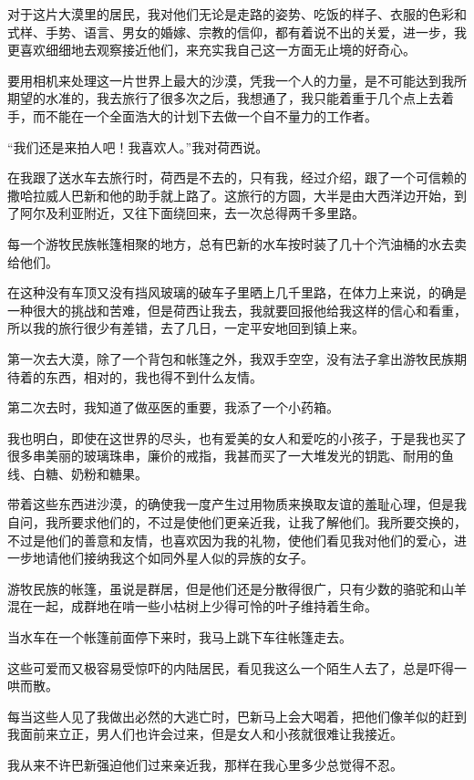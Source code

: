 \par 对于这片大漠里的居民，我对他们无论是走路的姿势、吃饭的样子、衣服的色彩和式样、手势、语言、男女的婚嫁、宗教的信仰，都有着说不出的关爱，进一步，我更喜欢细细地去观察接近他们，来充实我自己这一方面无止境的好奇心。
\par 要用相机来处理这一片世界上最大的沙漠，凭我一个人的力量，是不可能达到我所期望的水准的，我去旅行了很多次之后，我想通了，我只能着重于几个点上去着手，而不能在一个全面浩大的计划下去做一个自不量力的工作者。
\par “我们还是来拍人吧！我喜欢人。”我对荷西说。
\par 在我跟了送水车去旅行时，荷西是不去的，只有我，经过介绍，跟了一个可信赖的撒哈拉威人巴新和他的助手就上路了。这旅行的方圆，大半是由大西洋边开始，到了阿尔及利亚附近，又往下面绕回来，去一次总得两千多里路。
\par 每一个游牧民族帐篷相聚的地方，总有巴新的水车按时装了几十个汽油桶的水去卖给他们。
\par 在这种没有车顶又没有挡风玻璃的破车子里晒上几千里路，在体力上来说，的确是一种很大的挑战和苦难，但是荷西让我去，我就要回报他给我这样的信心和看重，所以我的旅行很少有差错，去了几日，一定平安地回到镇上来。
\par 第一次去大漠，除了一个背包和帐篷之外，我双手空空，没有法子拿出游牧民族期待着的东西，相对的，我也得不到什么友情。
\par 第二次去时，我知道了做巫医的重要，我添了一个小药箱。
\par 我也明白，即使在这世界的尽头，也有爱美的女人和爱吃的小孩子，于是我也买了很多串美丽的玻璃珠串，廉价的戒指，我甚而买了一大堆发光的钥匙、耐用的鱼线、白糖、奶粉和糖果。
\par 带着这些东西进沙漠，的确使我一度产生过用物质来换取友谊的羞耻心理，但是我自问，我所要求他们的，不过是使他们更亲近我，让我了解他们。我所要交换的，不过是他们的善意和友情，也喜欢因为我的礼物，使他们看见我对他们的爱心，进一步地请他们接纳我这个如同外星人似的异族的女子。
\par 游牧民族的帐篷，虽说是群居，但是他们还是分散得很广，只有少数的骆驼和山羊混在一起，成群地在啃一些小枯树上少得可怜的叶子维持着生命。
\par 当水车在一个帐篷前面停下来时，我马上跳下车往帐篷走去。
\par 这些可爱而又极容易受惊吓的内陆居民，看见我这么一个陌生人去了，总是吓得一哄而散。
\par 每当这些人见了我做出必然的大逃亡时，巴新马上会大喝着，把他们像羊似的赶到我面前来立正，男人们也许会过来，但是女人和小孩就很难让我接近。
\par 我从来不许巴新强迫他们过来亲近我，那样在我心里多少总觉得不忍。
